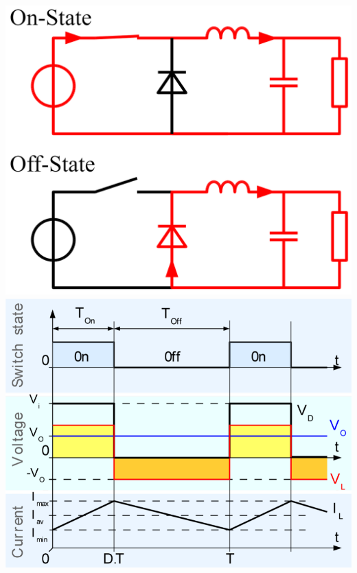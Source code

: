 \begin{minipage}{0.25\linewidth}
    \includegraphics[width=\linewidth]{images/BuckOnOff}
    \includegraphics[width=\linewidth]{images/BuckSwitch}
\end{minipage}

